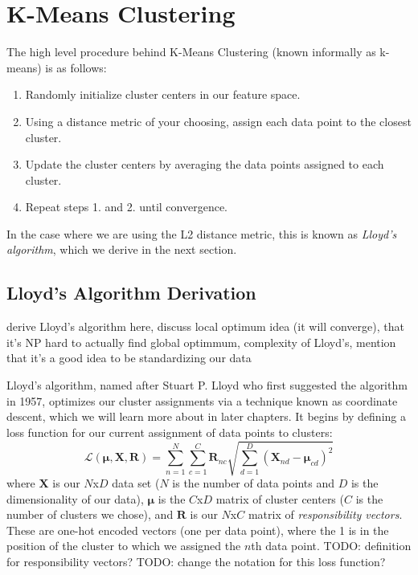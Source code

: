 \section{K-Means Clustering}
The high level procedure behind K-Means Clustering (known informally as k-means) is as follows:

\begin{enumerate}
    \item Randomly initialize cluster centers in our feature space.
    \item Using a distance metric of your choosing, assign each data point to the closest cluster.
    \item Update the cluster centers by averaging the data points assigned to each cluster.
    \item Repeat steps 1. and 2. until convergence.
\end{enumerate}

In the case where we are using the L2 distance metric, this is known as \textit{Lloyd's algorithm}, which we derive in the next section.

\subsection{Lloyd's Algorithm Derivation}
derive Lloyd's algorithm here, discuss local optimum idea (it will converge), that it's NP hard to actually find global optimmum, complexity of Lloyd's, mention that it's a good idea to be standardizing our data

Lloyd's algorithm, named after Stuart P. Lloyd who first suggested the algorithm in 1957, optimizes our cluster assignments via a technique known as coordinate descent, which we will learn more about in later chapters. It begins by defining a loss function for our current assignment of data points to clusters:
\begin{equation} \label{clustering-loss-fn}
	\mathcal{L}(\boldsymbol{\mu}, \textbf{X}, \textbf{R}) = \sum_{n=1}^{N} \sum_{c=1}^{C} \textbf{R}_{nc} \sqrt{\sum_{d=1}^{D} (\textbf{X}_{nd} - \boldsymbol{\mu}_{cd})^{2}}
\end{equation}
where $\textbf{X}$ is our $N$x$D$ data set ($N$ is the number of data points and $D$ is the dimensionality of our data), $\boldsymbol{\mu}$ is the $C$x$D$ matrix of cluster centers ($C$ is the number of clusters we chose), and $\textbf{R}$ is our $N$x$C$ matrix of \textit{responsibility vectors}. These are one-hot encoded vectors (one per data point), where the 1 is in the position of the cluster to which we assigned the $n$th data point. TODO: definition for responsibility vectors? TODO: change the notation for this loss function?

